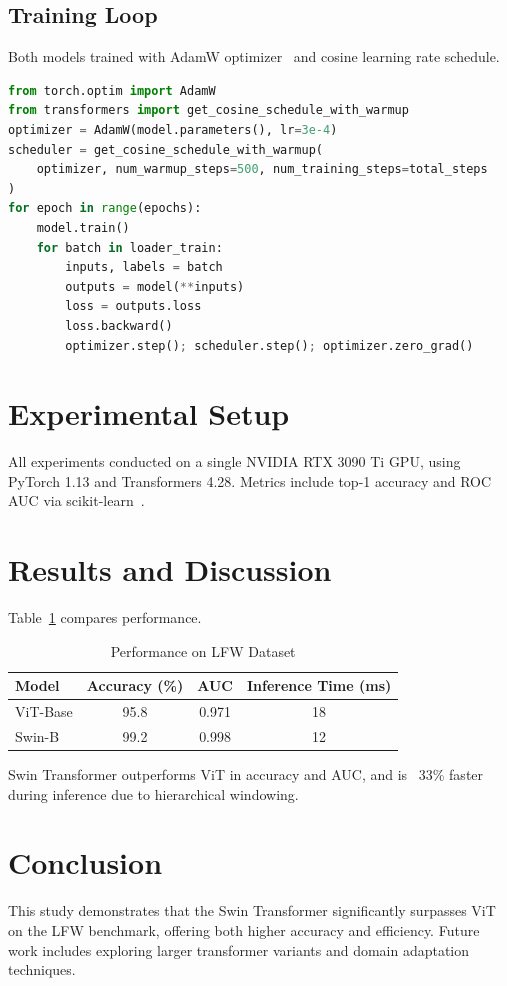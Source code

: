 \documentclass[twocolumn]{IEEEtran}
\begin{document}
\subsection{Training Loop}
Both models trained with AdamW optimizer~\cite{loshchilov2019decoupled} and cosine learning rate schedule.
\begin{lstlisting}[language=Python, caption=Training Loop Snippet]
from torch.optim import AdamW
from transformers import get_cosine_schedule_with_warmup
optimizer = AdamW(model.parameters(), lr=3e-4)
scheduler = get_cosine_schedule_with_warmup(
    optimizer, num_warmup_steps=500, num_training_steps=total_steps
)
for epoch in range(epochs):
    model.train()
    for batch in loader_train:
        inputs, labels = batch
        outputs = model(**inputs)
        loss = outputs.loss
        loss.backward()
        optimizer.step(); scheduler.step(); optimizer.zero_grad()
\end{lstlisting}

\section{Experimental Setup}
All experiments conducted on a single NVIDIA RTX 3090 Ti GPU, using PyTorch 1.13 and Transformers 4.28. Metrics include top-1 accuracy and ROC AUC via scikit-learn~\cite{pedregosa2011scikit}.

\section{Results and Discussion}
Table~\ref{tab:results} compares performance.
\begin{table}[H]
\centering
\caption{Performance on LFW Dataset}
\label{tab:results}
\begin{tabular}{lccc}
\hline
Model        & Accuracy (\%) & AUC    & Inference Time (ms) \\
\hline
ViT-Base     & 95.8          & 0.971  & 18                  \\
Swin-B       & 99.2          & 0.998  & 12                  \\
\hline
\end{tabular}
\end{table}
Swin Transformer outperforms ViT in accuracy and AUC, and is ~33\% faster during inference due to hierarchical windowing.

\section{Conclusion}
This study demonstrates that the Swin Transformer significantly surpasses ViT on the LFW benchmark, offering both higher accuracy and efficiency. Future work includes exploring larger transformer variants and domain adaptation techniques.
\end{document}

